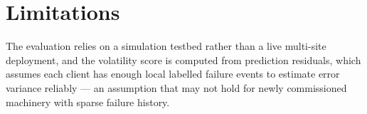 \section{Limitations}
The evaluation relies on a simulation testbed rather than a live multi-site deployment,
and the volatility score is computed from prediction residuals, which assumes each
client has enough local labelled failure events to estimate error variance reliably —
an assumption that may not hold for newly commissioned machinery with sparse failure
history.
